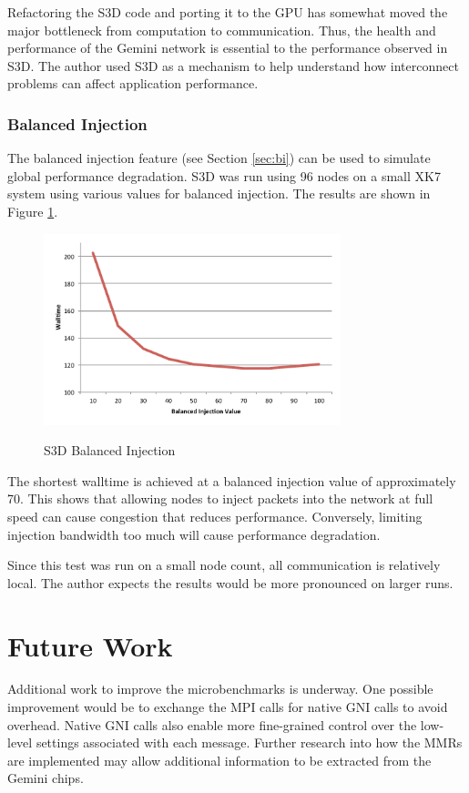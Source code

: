 \documentclass[10pt, conference, compsocconf]{IEEEtran}
\begin{document}
Refactoring the S3D code and porting it to the GPU has somewhat moved the major
bottleneck from computation to communication.  Thus, the health and performance
of the Gemini network is essential to the performance observed in S3D.  The
author used S3D as a mechanism to help understand how interconnect problems can
affect application performance.

\subsubsection{Balanced Injection}

The balanced injection feature (see Section \ref{sec:bi}) can be used to
simulate global performance degradation.  S3D was run using 96 nodes on a small
XK7 system using various values for balanced injection.  The results are shown
in Figure \ref{fig:s3dbi}.

\begin{figure}[h]
  \centering
  \includegraphics[width=3.4in]{figures/s3d_bisweep.pdf}\\
  \caption{S3D Balanced Injection}\label{fig:s3dbi}
\end{figure}

The shortest walltime is achieved at a balanced injection value of
approximately 70.  This shows that allowing nodes to inject packets into the
network at full speed can cause congestion that reduces performance.
Conversely, limiting injection bandwidth too much will cause performance
degradation.

Since this test was run on a small node count, all communication is relatively
local.  The author expects the results would be more pronounced on larger runs.

\section{Future Work}

Additional work to improve the microbenchmarks is underway.  One possible
improvement would be to exchange the MPI calls for native GNI calls to avoid
overhead.  Native GNI calls also enable more fine-grained control over the
low-level settings associated with each message.  Further research into how the
MMRs are implemented may allow additional information to be extracted from the
Gemini chips.
\end{document}
